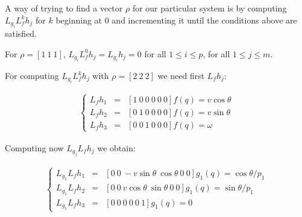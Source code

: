 \documentclass[letterpaper, 10 pt, conference]{ieeeconf}  %
\begin{document}
A way of trying to find a vector $\rho$ for our particular system is by computing $L_{g_i}L_f^kh_j$ for $k$ beginning at $0$ and incrementing it until the conditions above are satisfied.

For $\rho = [1\ 1\ 1]$, $L_{g_i}L_f^0h_j = L_{g_i}h_j = 0$ for all $1 \leq i \leq p$, for all $1 \leq j \leq m$.

%

For computing $L_{g_i}L_f^kh_j$ with $\rho = [2\ 2\ 2]$ we need first $L_fh_j$:

\begin{eqnarray}
\left\lbrace\begin{array}{lcl}
L_{f}h_1 & = & [1\ 0\ 0\ 0\ 0\ 0]f(q) = v\cos\theta\\
L_{f}h_2 & = & [0\ 1\ 0\ 0\ 0\ 0]f(q) = v\sin\theta\\
L_{f}h_3 & = & [0\ 0\ 1\ 0\ 0\ 0]f(q) = \omega
\end{array}\right.
\end{eqnarray}

Computing now $L_{g_j}L_fh_j$ we obtain:

\begin{eqnarray}
\left\lbrace\begin{array}{lcl}
L_{g_1}L_{f}h_1 & = & [0\ 0\ -v\sin\theta\ \cos\theta\ 0\ 0]g_1(q) = \cos\theta/p_1\\
L_{g_1}L_{f}h_2 & = & [0\ 0\ v\cos\theta\ \sin\theta\ 0\ 0]g_1(q) = \sin\theta/p_1\\
L_{g_1}L_{f}h_3 & = & [0\ 0\ 0\ 0\ 0\ 1]g_1(q) = 0
\end{array}\right.
\end{eqnarray}
\end{document}
